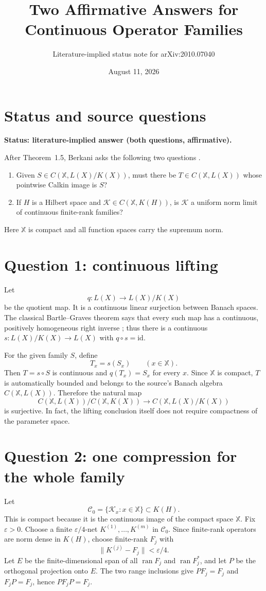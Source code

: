 \documentclass[11pt]{article}
\title{Two Affirmative Answers for Continuous Operator Families}
\author{Literature-implied status note for arXiv:2010.07040}
\date{August 11, 2026}
\begin{document}
\maketitle

\section*{Status and source questions}
\textbf{Status: literature-implied answer (both questions, affirmative).}

After Theorem~1.5, Berkani asks the following two questions
\cite[p.~4]{Berkani}.
\begin{enumerate}
\item Given $S\in C(\mathbb X,L(X)/K(X))$, must there be
$T\in C(\mathbb X,L(X))$ whose pointwise Calkin image is $S$?
\item If $H$ is a Hilbert space and
$\mathcal K\in C(\mathbb X,K(H))$, is $\mathcal K$ a uniform norm limit of
continuous finite-rank families?
\end{enumerate}
Here $\mathbb X$ is compact and all function spaces carry the supremum norm.

\section*{Question 1: continuous lifting}
Let
\[
 q:L(X)\longrightarrow L(X)/K(X)
\]
be the quotient map.  It is a continuous linear surjection between Banach
spaces.  The classical Bartle--Graves theorem says that every such map has a
continuous, positively homogeneous right inverse
\cite[Theorem~5.1, p.~14]{Messerschmidt}; thus there is a continuous
$s:L(X)/K(X)\to L(X)$ with $q\circ s=\mathrm{id}$.

For the given family $S$, define
\[
 T_x=s(S_x)\qquad(x\in\mathbb X).
\]
Then $T=s\circ S$ is continuous and $q(T_x)=S_x$ for every $x$.  Since
$\mathbb X$ is compact, $T$ is automatically bounded and belongs to the
source's Banach algebra $C(\mathbb X,L(X))$.  Therefore the natural map
\[
 C(\mathbb X,L(X))/C(\mathbb X,K(X))
 \longrightarrow C(\mathbb X,L(X)/K(X))
\]
is surjective.  In fact, the lifting conclusion itself does not require
compactness of the parameter space.

\section*{Question 2: one compression for the whole family}
Let
\[
 \mathcal C_0=\{\mathcal K_x:x\in\mathbb X\}\subset K(H).
\]
This is compact because it is the continuous image of the compact space
$\mathbb X$.  Fix $\varepsilon>0$.  Choose a finite
$\varepsilon/4$-net $K^{(1)},\ldots,K^{(m)}$ in $\mathcal C_0$.  Since
finite-rank operators are norm dense in $K(H)$, choose finite-rank $F_j$ with
\[
 \|K^{(j)}-F_j\|<\varepsilon/4.
\]
Let $E$ be the finite-dimensional span of all
$\operatorname{ran}F_j$ and $\operatorname{ran}F_j^*$, and let $P$ be the
orthogonal projection onto $E$.  The two range inclusions give
$PF_j=F_j$ and $F_jP=F_j$, hence $PF_jP=F_j$.
\end{document}
